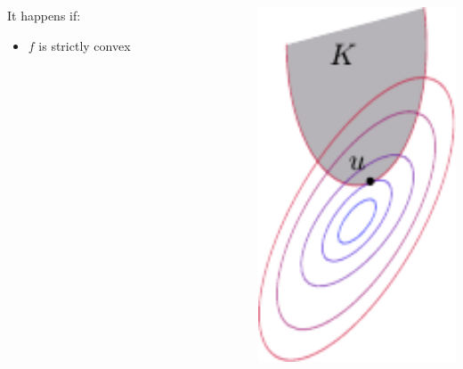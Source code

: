 \documentclass{beamer}
\begin{document}
\begin{frame}
\begin{columns}
\begin{column}{0.7\textwidth}
It happens if:
\begin{itemize}
\item $f$ is strictly convex
\end{itemize}
\end{column}
\begin{column}{0.3\textwidth}
\includegraphics[width=1.0\textwidth]{constrained-opt}
\end{column}
\end{columns}
\end{frame}
\end{document}
